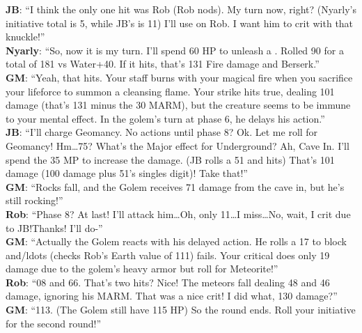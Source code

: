 \begin{multimog}
\textbf{JB}: \enquote{I think the only one hit was Rob (Rob nods). My turn now, right? (Nyarly's initiative total is 5, while JB's is 11) I'll use  on Rob. I want him to crit with that knuckle!} \\
\textbf{Nyarly}: \enquote{So, now it is my turn. I'll spend 60 HP to unleash a . Rolled 90 for a total of 181 vs Water+40. If it hits, that's 131 Fire damage and Berserk.} \\
\textbf{GM}: \enquote{Yeah, that hits. Your staff burns with your magical fire when you sacrifice your lifeforce to summon a cleansing flame. Your strike hits true, dealing 101 damage (that's 131 minus the 30 MARM), but the creature seems to be immune to your mental effect. In the golem's turn at phase 6, he delays his action.} \\
\textbf{JB}: \enquote{I'll charge Geomancy. No actions until phase 8? Ok. Let me roll for Geomancy! Hm\ldots 75? What’s the Major effect for Underground? Ah, Cave In. I'll spend the 35 MP to increase the damage. (JB rolls a 51 and hits) That's 101 damage (100 damage plus 51's singles digit)! Take that!} \\
\textbf{GM}: \enquote{Rocks fall, and the Golem receives 71 damage from the cave in, but he's still rocking!} \\
\textbf{Rob}: \enquote{Phase 8? At last! I'll attack him\ldots Oh, only 11\ldots I miss\ldots No, wait, I crit due to JB!\@{}Thanks! I'll do-} \\
\textbf{GM}: \enquote{Actually the Golem reacts with his delayed action. He rolls a 17 to block and/ldots (checks Rob's Earth value of 111) fails. Your critical does only 19 damage due to the golem's heavy armor but roll for Meteorite!} \\
\textbf{Rob}: \enquote{08 and 66. That's two hits? Nice! The meteors fall dealing 48 and 46 damage, ignoring his MARM\@. That was a nice crit! I did what, 130 damage?} \\
\textbf{GM}: \enquote{113. (The Golem still have 115 HP) So the round ends. Roll your initiative for the second round!} \\ 
\end{multimog}

